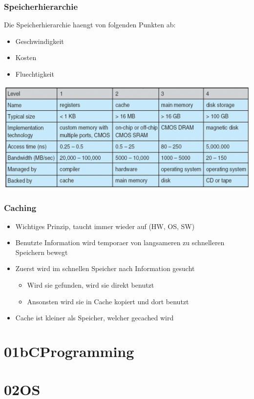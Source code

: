 \documentclass[a4paper]{scrreprt}
\begin{document}
\subsection{Speicherhierarchie}
Die Speicherhierarchie haengt von folgenden Punkten ab:
\begin{itemize}
	\item Geschwindigkeit
	\item Kosten
	\item Fluechtigkeit
\end{itemize}

\includegraphics[scale=0.4]{storage.png}

\subsection{Caching}
\begin{itemize}
	\item Wichtiges Prinzip, taucht immer wieder auf (HW, OS, SW)
	\item Benutzte Information wird temporaer von langsameren zu schnelleren Speichern bewegt
	\item Zuerst wird im schnellen Speicher nach Information gesucht
		\begin{itemize}
			\item Wird sie gefunden, wird sie direkt benutzt
			\item Ansonsten wird sie in Cache kopiert und dort benutzt
		\end{itemize}
	\item Cache ist kleiner als Speicher, welcher gecached wird
\end{itemize}





\chapter{01bCProgramming}
\chapter{02OS}
\end{document}
